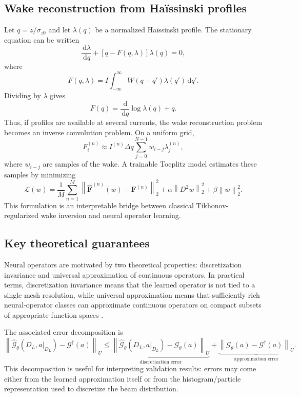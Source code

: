 \documentclass[11pt,a4paper]{article}
\providecommand{\norm}[1]{\left\lVert#1\right\rVert}
\providecommand{\dd}{\,\mathrm{d}}
\begin{document}
\begin{sloppypar}
\subsection{Wake reconstruction from Ha\"issinski profiles}
Let $q=z/\sigma_{z0}$ and let $\lambda(q)$ be a normalized Ha\"issinski profile. The stationary equation can be written
\begin{equation}
    \frac{\dd\lambda}{\dd q}+\left[q-F(q,\lambda)\right]\lambda(q)=0,
\end{equation}
where
\begin{equation}
    F(q,\lambda)=I\int_{-\infty}^{\infty}W(q-q')\lambda(q')\dd q'.
\end{equation}
Dividing by $\lambda$ gives
\begin{equation}
    F(q)=\frac{\dd}{\dd q}\log\lambda(q)+q.
\end{equation}
Thus, if profiles are available at several currents, the wake reconstruction problem becomes an inverse convolution problem. On a uniform grid,
\begin{equation}
    F_i^{(n)}\approx I^{(n)}\Delta q\sum_{j=0}^{N-1}w_{i-j}\lambda_j^{(n)},
\end{equation}
where $w_{i-j}$ are samples of the wake. A trainable Toeplitz model estimates these samples by minimizing
\begin{equation}
    \mathcal{L}(w)=\frac{1}{M}\sum_{n=1}^{M}\norm{\widehat{\bm F}^{(n)}(w)-\bm F^{(n)}}_2^2+\alpha\norm{D^2w}_2^2+\beta\norm{w}_2^2.
\end{equation}
This formulation is an interpretable bridge between classical Tikhonov-regularized wake inversion and neural operator learning.

\subsection{Key theoretical guarantees}
Neural operators are motivated by two theoretical properties: discretization invariance and universal approximation of continuous operators. In practical terms, discretization invariance means that the learned operator is not tied to a single mesh resolution, while universal approximation means that sufficiently rich neural-operator classes can approximate continuous operators on compact subsets of appropriate function spaces \cite{kovachki_neural_2023}.

The associated error decomposition is
\begin{equation}
    \norm{\widehat{\mathcal{G}}_{\theta}(D_L,a|_{D_L})-\mathcal{G}^{\dagger}(a)}_U
    \le
    \underbrace{\norm{\widehat{\mathcal{G}}_{\theta}(D_L,a|_{D_L})-\mathcal{G}_{\theta}(a)}_U}_{\text{discretization error}}
    +
    \underbrace{\norm{\mathcal{G}_{\theta}(a)-\mathcal{G}^{\dagger}(a)}_U}_{\text{approximation error}}.
\end{equation}
This decomposition is useful for interpreting validation results: errors may come either from the learned approximation itself or from the histogram/particle representation used to discretize the beam distribution.


\end{sloppypar}
\end{document}
